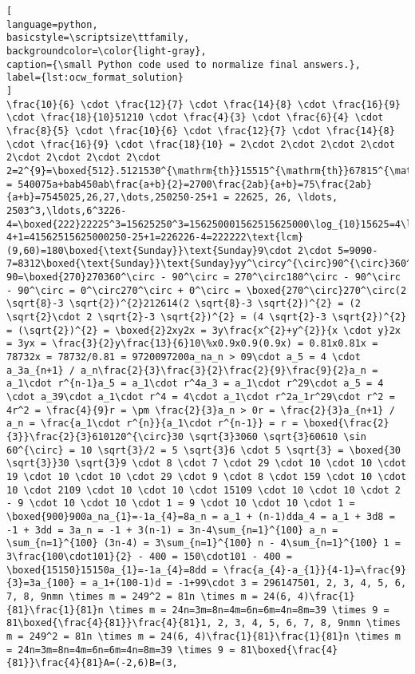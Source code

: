 \documentclass{article}
\begin{document}
\begin{lstlisting}[
language=python,
basicstyle=\scriptsize\ttfamily,
backgroundcolor=\color{light-gray},
caption={\small Python code used to normalize final answers.},
label={lst:ocw_format_solution}
]
\frac{10}{6} \cdot \frac{12}{7} \cdot \frac{14}{8} \cdot \frac{16}{9} \cdot \frac{18}{10}51210 \cdot \frac{4}{3} \cdot \frac{6}{4} \cdot \frac{8}{5} \cdot \frac{10}{6} \cdot \frac{12}{7} \cdot \frac{14}{8} \cdot \frac{16}{9} \cdot \frac{18}{10} = 2\cdot 2\cdot 2\cdot 2\cdot 2\cdot 2\cdot 2\cdot 2\cdot 2=2^{9}=\boxed{512}.5121530^{\mathrm{th}}15515^{\mathrm{th}}67815^{\mathrm{th}}2^{\mathrm{nd}}\boxed{8}.81516^{\mathrm{th}}617^{\mathrm{th}}618^{\mathrm{th}}619^{\mathrm{th}}620^{\mathrm{th}}621^{\mathrm{st}}722^{\mathrm{nd}}723^{\mathrm{rd}}724^{\mathrm{th}}725^{\mathrm{th}}726^{\mathrm{th}}727^{\mathrm{th}}828^{\mathrm{th}}829^{\mathrm{th}}830^{\mathrm{th}}88270075ab2700,a+b = 540075a+bab450ab\frac{a+b}{2}=2700\frac{2ab}{a+b}=75\frac{2ab}{a+b}=7545025,26,27,\dots,250250-25+1 = 22625, 26, \ldots, 2503^3,\ldots,6^3226-4=\boxed{222}22225^3=15625250^3=156250001562515625000\log_{10}15625=4\log_{10}15625000=77-4+1=41562515625000250-25+1=226226-4=222222\text{lcm}(9,60)=180\boxed{\text{Sunday}}\text{Sunday}9\cdot 2\cdot 5=9090-7=8312\boxed{\text{Sunday}}\text{Sunday}yy^\circy^{\circ}90^{\circ}360^{\circ}y^{\circ}+90^{\circ}=360^{\circ}y=360-90=\boxed{270}270360^\circ - 90^\circ = 270^\circ180^\circ - 90^\circ - 90^\circ = 0^\circ270^\circ + 0^\circ = \boxed{270^\circ}270^\circ(2 \sqrt{8}-3 \sqrt{2})^{2}212614(2 \sqrt{8}-3 \sqrt{2})^{2} = (2 \sqrt{2}\cdot 2 \sqrt{2}-3 \sqrt{2})^{2} = (4 \sqrt{2}-3 \sqrt{2})^{2} = (\sqrt{2})^{2} = \boxed{2}2xy2x = 3y\frac{x^{2}+y^{2}}{x \cdot y}2x = 3yx = \frac{3}{2}y\frac{13}{6}10\%x0.9x0.9(0.9x) = 0.81x0.81x = 78732x = 78732/0.81 = 9720097200a_na_n > 09\cdot a_5 = 4 \cdot a_3a_{n+1} / a_n\frac{2}{3}\frac{3}{2}\frac{2}{9}\frac{9}{2}a_n = a_1\cdot r^{n-1}a_5 = a_1\cdot r^4a_3 = a_1\cdot r^29\cdot a_5 = 4 \cdot a_39\cdot a_1\cdot r^4 = 4\cdot a_1\cdot r^2a_1r^29\cdot r^2 = 4r^2 = \frac{4}{9}r = \pm \frac{2}{3}a_n > 0r = \frac{2}{3}a_{n+1} / a_n = \frac{a_1\cdot r^{n}}{a_1\cdot r^{n-1}} = r = \boxed{\frac{2}{3}}\frac{2}{3}610120^{\circ}30 \sqrt{3}3060 \sqrt{3}60610 \sin 60^{\circ} = 10 \sqrt{3}/2 = 5 \sqrt{3}6 \cdot 5 \sqrt{3} = \boxed{30 \sqrt{3}}30 \sqrt{3}9 \cdot 8 \cdot 7 \cdot 29 \cdot 10 \cdot 10 \cdot 19 \cdot 10 \cdot 10 \cdot 29 \cdot 9 \cdot 8 \cdot 159 \cdot 10 \cdot 10 \cdot 2109 \cdot 10 \cdot 10 \cdot 15109 \cdot 10 \cdot 10 \cdot 2 - 9 \cdot 10 \cdot 10 \cdot 1 = 9 \cdot 10 \cdot 10 \cdot 1 = \boxed{900}900a_na_{1}=-1a_{4}=8a_n = a_1 + (n-1)dda_4 = a_1 + 3d8 = -1 + 3dd = 3a_n = -1 + 3(n-1) = 3n-4\sum_{n=1}^{100} a_n = \sum_{n=1}^{100} (3n-4) = 3\sum_{n=1}^{100} n - 4\sum_{n=1}^{100} 1 = 3\frac{100\cdot101}{2} - 400 = 150\cdot101 - 400 = \boxed{15150}15150a_{1}=-1a_{4}=8dd = \frac{a_{4}-a_{1}}{4-1}=\frac{9}{3}=3a_{100} = a_1+(100-1)d = -1+99\cdot 3 = 296147501, 2, 3, 4, 5, 6, 7, 8, 9nmn \times m = 249^2 = 81n \times m = 24(6, 4)\frac{1}{81}\frac{1}{81}n \times m = 24n=3m=8n=4m=6n=6m=4n=8m=39 \times 9 = 81\boxed{\frac{4}{81}}\frac{4}{81}1, 2, 3, 4, 5, 6, 7, 8, 9nmn \times m = 249^2 = 81n \times m = 24(6, 4)\frac{1}{81}\frac{1}{81}n \times m = 24n=3m=8n=4m=6n=6m=4n=8m=39 \times 9 = 81\boxed{\frac{4}{81}}\frac{4}{81}A=(-2,6)B=(3, 
\end{lstlisting}
\end{document}
